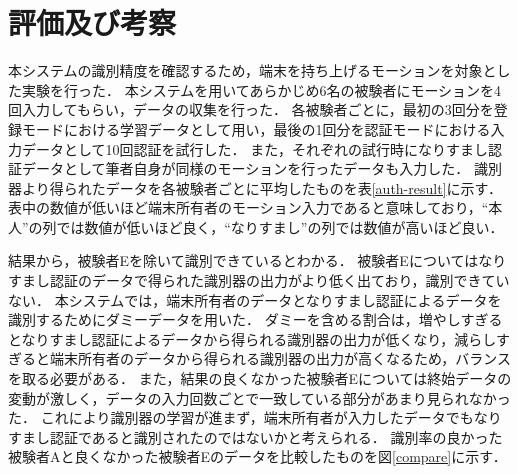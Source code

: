 \section{評価及び考察}
本システムの識別精度を確認するため，端末を持ち上げるモーションを対象とした実験を行った．
本システムを用いてあらかじめ6名の被験者にモーションを4回入力してもらい，データの収集を行った．
各被験者ごとに，最初の3回分を登録モードにおける学習データとして用い，最後の1回分を認証モードにおける入力データとして10回認証を試行した．
また，それぞれの試行時になりすまし認証データとして筆者自身が同様のモーションを行ったデータも入力した．
識別器より得られたデータを各被験者ごとに平均したものを表\ref{auth-result}に示す．
表中の数値が低いほど端末所有者のモーション入力であると意味しており，``本人''の列では数値が低いほど良く，``なりすまし''の列では数値が高いほど良い．

結果から，被験者Eを除いて識別できているとわかる．
被験者Eについてはなりすまし認証のデータで得られた識別器の出力がより低く出ており，識別できていない．
本システムでは，端末所有者のデータとなりすまし認証によるデータを識別するためにダミーデータを用いた．
ダミーを含める割合は，増やしすぎるとなりすまし認証によるデータから得られる識別器の出力が低くなり，減らしすぎると端末所有者のデータから得られる識別器の出力が高くなるため，バランスを取る必要がある．
また，結果の良くなかった被験者Eについては終始データの変動が激しく，データの入力回数ごとで一致している部分があまり見られなかった．
これにより識別器の学習が進まず，端末所有者が入力したデータでもなりすまし認証であると識別されたのではないかと考えられる．
識別率の良かった被験者Aと良くなかった被験者Eのデータを比較したものを図\ref{compare}に示す．

